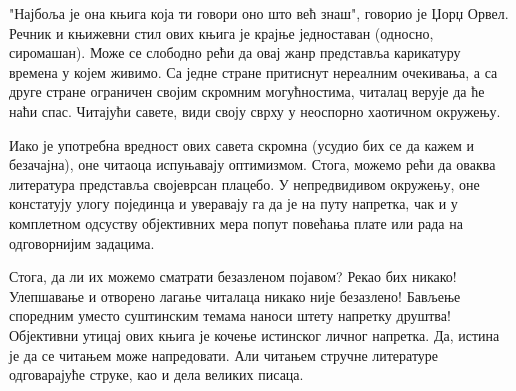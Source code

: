 \documentclass[b5paper]{article}
\begin{document}
"Најбоља је она књига која ти говори оно што већ знаш", говорио је Џорџ Орвел. Речник и књижевни стил ових књига је крајње једноставан (односно, сиромашан). Може се слободно рећи да овај жанр представља карикатуру времена у којем живимо. Са једне стране притиснут нереалним очекивања, а са друге стране ограничен својим скромним могућностима, читалац верује да ће наћи спас. Читајући савете, види своју сврху у неоспорно хаотичном окружењу.

Иако је употребна вредност ових савета скромна (усудио бих се да кажем и безачајна), оне читаоца испуњавају оптимизмом. Стога, можемо рећи да оваква литература представља својеврсан плацебо. У непредвидивом окружењу, оне констатују улогу појединца и уверавају га да је на путу напретка, чак и у комплетном одсуству објективних мера попут повећања плате или рада на одговорнијим задацима.

Стога, да ли их можемо сматрати безазленом појавом? Рекао бих никако! Улепшавање и отворено лагање читалаца никако није безазлено! Бављење споредним уместо суштинским темама наноси штету напретку друштва! Објективни утицај ових књига је кочење истинског личног напретка. Да, истина је да се читањем може напредовати. Али читањем стручне литературе одговарајуће струке, као и дела великих писаца.
\end{document}
